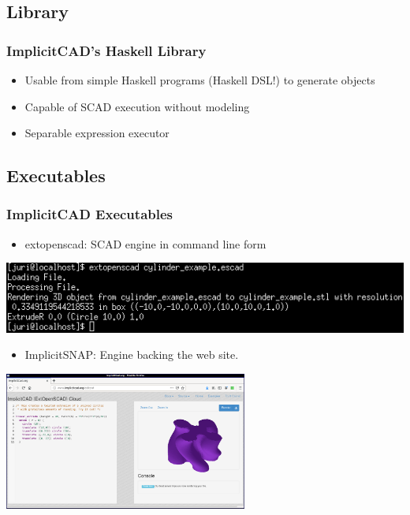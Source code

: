 \documentclass{beamer}
\begin{document}
\subsection{Library}
\begin{frame}
\frametitle{ImplicitCAD's Haskell Library}
\begin{itemize}
\item Usable from simple Haskell programs (Haskell DSL!) to generate objects
\item Capable of SCAD execution without modeling
\item Separable expression executor
\end{itemize}
\end{frame}

\subsection{Executables}
\begin{frame}
\frametitle{ImplicitCAD Executables}
\begin{itemize}
\item extopenscad: SCAD engine in command line form
\end{itemize}
\includegraphics[width=1.0\textwidth, left]{extopenscad_example.png}
\begin{itemize}
\item ImplicitSNAP: Engine backing the web site.
\end{itemize}
\includegraphics[width=0.6\textwidth, center]{website-frame_grab.png}
\end{frame}
\end{document}
